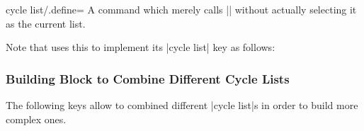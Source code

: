 \begin{pgfplotskey}{cycle list/.define=}
    A command which merely calls
    |\pgfplotscreateplotcyclelist| without actually
    selecting it as the current list.

    Note that \PGFPlots{} uses this to implement its |cycle list| key as
    follows:
\begin{codeexample}
\end{codeexample}
\end{pgfplotskey}


\subsubsection{Building Block to Combine Different Cycle Lists}

The following keys allow to combined different |cycle list|s in order to build
more complex ones.

